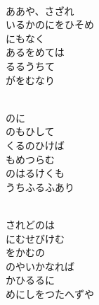 \documentclass[10pt,b5j]{tarticle} %
\begin{document}
\begin{enumerate}
\begin{minipage}[c]{\blocksize}
        \vspace{\linespace}
        \item~\\
        ああや、さざれ\\
        いるかのにをひそめ\\
        にもなく\\
        あるをめては\\
        るるうちて\\
        がをむなり
        
    \end{minipage}
    \begin{minipage}[c]{\blocksize}
        
        \vspace{\linespace}
        \item~\\
        のに\\
        のもひして\\
        くるのひけば\\
        もめつらむ\\
        のはるけくも\\
        うちふるふあり
        
    \end{minipage}
    \begin{minipage}[c]{\blocksize}
        
        \vspace{\linespace}
        \item~\\
        されどのは\\
        にむせびけむ\\
        をかむの\\
        のやいかなれば\\
        かひるるに\\
        めにしをつたへずや
        

\end{minipage}
\end{enumerate}
\end{document}
